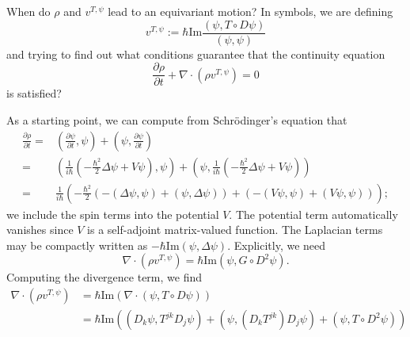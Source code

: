\documentclass[11pt]{article}
\theoremstyle{remark}
\begin{document}
When do $\ensuremath{\rho}$ and
$v^{T, \ensuremath{\psi}}$ lead to an equivariant motion? In symbols, we are
defining 
 \[
v^{T, \ensuremath{\psi}} \ensuremath{:=} \ensuremath{\hbar} \textrm{Im} \frac{\ensuremath{({\ensuremath{\psi}}, {T\circ D\ensuremath{\psi}})}}{\ensuremath{({\ensuremath{\psi}}, {\ensuremath{\psi}})}}  
\]
and trying to find out what conditions guarantee that the continuity equation
\[
\ensuremath{\frac{\partial {\ensuremath{\rho}}}{\partial {t}}} + \nabla \cdot (\ensuremath{\rho} v^{T, \ensuremath{\psi}}) = 0
\]
is satisfied? 
 
As a starting point, we can compute from Schr\"odinger's equation that
\[
\begin{split}
\ensuremath{\frac{\partial {\ensuremath{\rho}}}{\partial {t}}} =& \ensuremath{({\ensuremath{\frac{\partial {\ensuremath{\psi}}}{\partial {t}}}}, {\ensuremath{\psi}})} +
\ensuremath{({\ensuremath{\psi}}, {\ensuremath{\frac{\partial {\ensuremath{\psi}}}{\partial {t}}}})} 
\\  = & 
\ensuremath{({\frac{1}{i\ensuremath{\hbar}}(-\frac{\ensuremath{\hbar}^2}{2} \ensuremath{\Delta} \ensuremath{\psi} + V \ensuremath{\psi})}, {\ensuremath{\psi}})} +   
\ensuremath{({\ensuremath{\psi}}, {\frac{1}{i\ensuremath{\hbar}}(-\frac{\ensuremath{\hbar}^2}{2} \ensuremath{\Delta} \ensuremath{\psi} + V \ensuremath{\psi})})}
\\ = &
 \frac{1}{i\ensuremath{\hbar}} (-\frac{\ensuremath{\hbar}^2}{2}(-\ensuremath{({\ensuremath{\Delta} \ensuremath{\psi}}, {\ensuremath{\psi}})} + \ensuremath{({\ensuremath{\psi}}, {\ensuremath{\Delta}
 \ensuremath{\psi}})}) + (-\ensuremath{({V \ensuremath{\psi}}, {\ensuremath{\psi}})} + \ensuremath{({V \ensuremath{\psi}}, {\ensuremath{\psi}})}));
\end{split}
\]
we include the spin terms into the potential $V$.
The potential term automatically vanishes since $V$ is
a self-adjoint matrix-valued function. 
The Laplacian terms may be compactly written as
 $-\ensuremath{\hbar} \textrm{Im} \ensuremath{({\ensuremath{\psi}}, {\ensuremath{\Delta}
\ensuremath{\psi}})}$.  
Explicitly, we need
\[
\nabla \cdot (\ensuremath{\rho} v^{T, \ensuremath{\psi}}) = \ensuremath{\hbar} \textrm{Im} \ensuremath{({\ensuremath{\psi}}, {G\circ D^2 \ensuremath{\psi}})}.
\]
Computing the divergence term, we find
\[
\begin{split}
\nabla \cdot (\ensuremath{\rho} v^{T, \ensuremath{\psi}}) &= 
\ensuremath{\hbar} \textrm{Im} (\nabla \cdot \ensuremath{({\ensuremath{\psi}}, {T\circ D\ensuremath{\psi}})}) \\
&= 
\ensuremath{\hbar} \textrm{Im} (\ensuremath{({D_{\ensuremath{k}}\ensuremath{\psi}}, {T^{\ensuremath{j} \ensuremath{k}} D_{\ensuremath{j}}\ensuremath{\psi}})} +
\ensuremath{({\ensuremath{\psi}}, {(D_{\ensuremath{k}}T^{\ensuremath{j} \ensuremath{k}})  D_{\ensuremath{j}}\ensuremath{\psi}})} + 
\ensuremath{({\ensuremath{\psi}}, {T \circ D^2 \ensuremath{\psi}})})
\end{split}
\]
\end{document}
